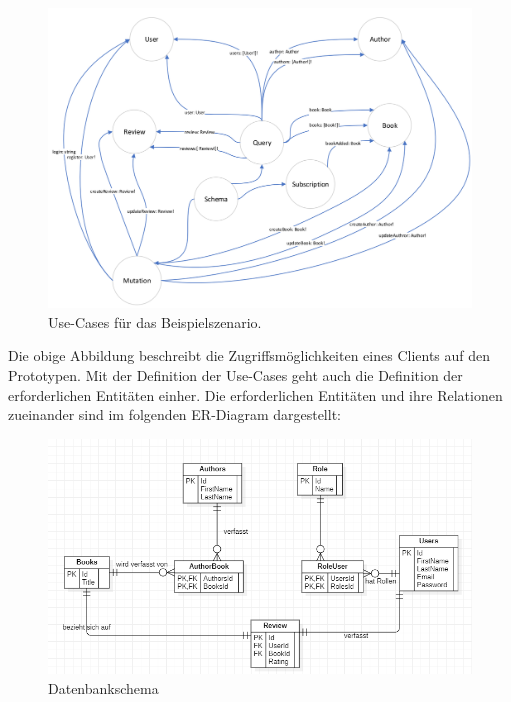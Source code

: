 \begin{figure}[H]
    \includegraphics[width=\textwidth]{pics/graph_usecases.png}
    \caption{Use-Cases für das Beispielszenario.}
\end{figure}

Die obige Abbildung beschreibt die Zugriffsmöglichkeiten eines Clients auf den Prototypen.
Mit der Definition der Use-Cases geht auch die Definition der erforderlichen Entitäten einher.
Die erforderlichen Entitäten und ihre Relationen zueinander sind im folgenden ER-Diagram dargestellt:


\begin{figure}[H]
    \includegraphics[width=\textwidth]{pics/ER-Diagram.png}
    \caption{Datenbankschema}
\end{figure}

